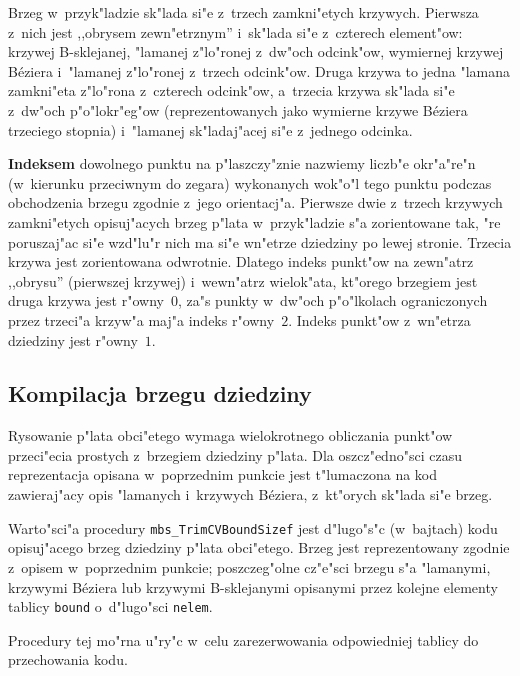 Brzeg w~przyk"ladzie sk"lada si"e z~trzech zamkni"etych krzywych. Pierwsza
z~nich jest ,,obrysem zewn"etrznym'' i~sk"lada si"e z~czterech element"ow:
krzywej B-sklejanej, "lamanej z"lo"ronej z~dw"och odcink"ow, wymiernej krzywej
B\'{e}ziera i~"lamanej z"lo"ronej z~trzech odcink"ow. Druga krzywa to
jedna "lamana zamkni"eta z"lo"rona z~czterech odcink"ow, a~trzecia krzywa
sk"lada si"e z~dw"och p"o"lokr"eg"ow (reprezentowanych jako wymierne krzywe
B\'{e}ziera trzeciego stopnia) i~"lamanej sk"ladaj"acej si"e z~jednego
odcinka.

\textbf{Indeksem} dowolnego punktu na p"laszczy"znie nazwiemy liczb"e
okr"a"re"n (w~kierunku przeciwnym do zegara) wykonanych wok"o"l tego punktu
podczas obchodzenia brzegu zgodnie z~jego orientacj"a. Pierwsze dwie
z~trzech krzywych zamkni"etych opisuj"acych brzeg p"lata w~przyk"ladzie s"a
zorientowane tak, "re poruszaj"ac si"e wzd"lu"r nich ma si"e wn"etrze
dziedziny po lewej stronie. Trzecia krzywa jest zorientowana odwrotnie.
Dlatego indeks punkt"ow na zewn"atrz ,,obrysu'' (pierwszej krzywej)
i~wewn"atrz wielok"ata, kt"orego brzegiem jest druga krzywa jest r"owny~$0$,
za"s punkty w~dw"och p"o"lkolach ograniczonych przez trzeci"a krzyw"a maj"a
indeks r"owny~$2$. Indeks punkt"ow z~wn"etrza dziedziny jest r"owny~$1$.


\subsection{Kompilacja brzegu dziedziny}

Rysowanie p"lata obci"etego wymaga wielokrotnego obliczania punkt"ow
przeci"ecia prostych z~brzegiem dziedziny p"lata. Dla oszcz"edno"sci czasu
reprezentacja opisana w~poprzednim punkcie jest t"lumaczona na kod
zawieraj"acy opis "lamanych i~krzywych B\'{e}ziera, z~kt"orych sk"lada si"e
brzeg.

\vspace{\bigskipamount}
Warto"sci"a procedury \texttt{mbs\_TrimCVBoundSizef} jest d"lugo"s"c
(w~bajtach) kodu opisuj"acego brzeg dziedziny p"lata obci"etego. Brzeg jest
reprezentowany zgodnie z~opisem w~poprzednim punkcie; poszczeg"olne cz"e"sci
brzegu s"a "lamanymi, krzywymi B\'{e}ziera lub krzywymi B-sklejanymi
opisanymi przez kolejne elementy tablicy \texttt{bound} o~d"lugo"sci
\texttt{nelem}.

Procedury tej mo"rna u"ry"c w~celu zarezerwowania odpowiedniej tablicy do
przechowania kodu.


